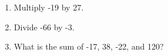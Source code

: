 \documentclass[12pt]{article}
\begin{document}
\begin{enumerate}
\item Multiply -19 by 27.
  \vspace{0.5in}
  \vspace{0.5in}
  \vspace{0.5in}

\item Divide -66 by -3. 
  \vspace{0.5in}
  \vspace{0.5in}
  \vspace{0.5in}

\item What is the sum of -17, 38, -22, and 120? 
  \vspace{0.5in}
  \vspace{0.5in}
  \vspace{0.5in}

\end{enumerate}
\end{document}
